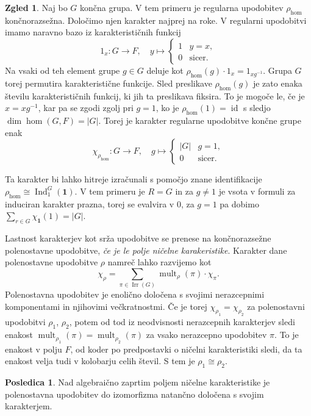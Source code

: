 \documentclass[11pt]{book}
\def\11{\mathbf{1}}
\DeclareMathOperator\Ind{Ind}
\DeclareMathOperator\mult{mult}
\DeclareMathOperator\Irr{Irr}
\DeclareMathOperator\id{id}
\theoremstyle{definition}
\theoremstyle{zgled}
\newtheorem*{zgled}{Zgled}
\theoremstyle{odprtproblem}
\theoremstyle{domacanaloga}
\theoremstyle{izrek}
\newtheorem*{posledica}{Posledica}
\begin{document}
\begin{zgled}
    Naj bo $G$ končna grupa. V tem primeru je regularna upodobitev $\rho_{\hom}$ končnorazsežna. Določimo njen karakter najprej na roke. V regularni upodobitvi imamo naravno bazo iz karakterističnih funkcij
    \[
        1_{x} \colon G \to F, \quad
        y \mapsto \begin{cases} 1 & y = x, \\ 0 & \text{sicer.} \end{cases}
    \]
    Na vsaki od teh element grupe $g \in G$ deluje kot $\rho_{\hom}(g) \cdot 1_x = 1_{x g^{-1}}$. Grupa $G$ torej permutira karakteristične funkcije. Sled preslikave $\rho_{\hom}(g)$ je zato enaka številu karakterističnih funkcij, ki jih ta preslikava fiksira. To je mogoče le, če je $x = x g^{-1}$, kar pa se zgodi zgolj pri $g = 1$, ko je $\rho_{\hom}(1) = \id$ s sledjo $\dim \hom(G,F) = |G|$. Torej je karakter regularne upodobitve končne grupe enak
    \[
        \chi_{\rho_{\hom}} \colon G \to F, \quad
        g \mapsto \begin{cases} |G| & g = 1, \\ 0 & \text{sicer.} \end{cases}
    \]
    
    Ta karakter bi lahko hitreje izračunali s pomočjo znane identifikacije $\rho_{\hom} \cong \Ind^G_1(\11)$. V tem primeru je $R = G$ in za $g \neq 1$ je vsota v formuli za induciran karakter prazna, torej se evalvira v $0$, za $g = 1$ pa dobimo $\sum_{r \in G} \chi_{\11}(1) = |G|$.
\end{zgled}

Lastnost karakterjev kot srža upodobitve se prenese na končnorazsežne polenostavne upodobitve, \emph{če je le polje ničelne karakeristike}. Karakter dane polenostavne upodobitve $\rho$ namreč lahko razvijemo kot
\[
    \textstyle \chi_{\rho} = \sum_{\pi \in \Irr(G)} \mult_{\rho}(\pi) \cdot \chi_{\pi}.
\]
Polenostavna upodobitev je enolično določena s svojimi nerazcepnimi komponentami in njihovimi večkratnostmi. Če je torej $\chi_{\rho_1} = \chi_{\rho_2}$ za polenostavni upodobitvi $\rho_1$, $\rho_2$, potem od tod iz neodvisnosti nerazcepnih karakterjev sledi enakost $\mult_{\rho_1}(\pi) = \mult_{\rho_2}(\pi)$ za vsako nerazcepno upodobitev $\pi$. To je enakost v polju $F$, od koder po predpostavki o ničelni karakteristiki sledi, da ta enakost velja tudi v kolobarju celih števil. S tem je $\rho_1 \cong \rho_2$.

\begin{posledica}
Nad algebraično zaprtim poljem ničelne karakteristike je polenostavna upodobitev do izomorfizma natančno določena s svojim karakterjem.
\end{posledica}
\end{document}
